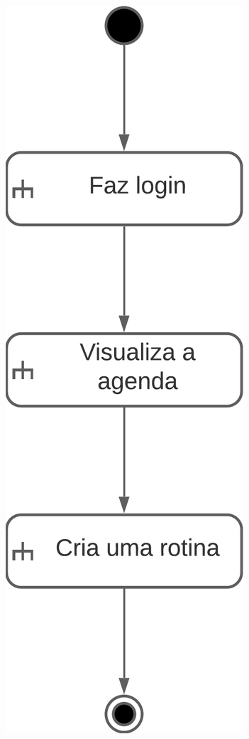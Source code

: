 \begin{figure}[h]
  \centering
  \includegraphics[scale=0.5]{images/diagrams/activity-one.png}
\end{figure}

